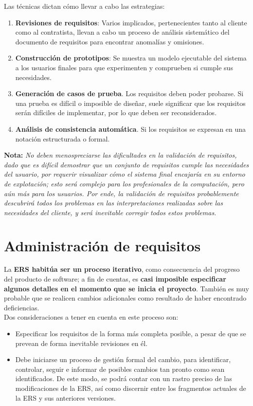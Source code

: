 Las técnicas dictan cómo llevar a cabo las estrategias:

\begin{enumerate}
    \item \textbf{Revisiones de requisitos}: Varios implicados, pertenecientes tanto al cliente como al contratista, llevan a cabo un proceso de análisis sistemático del documento de requisitos para encontrar anomalías y omisiones.
    \item \textbf{Construcción de prototipos}: Se muestra un modelo ejecutable del sistema a los usuarios finales para que experimenten y comprueben si cumple sus necesidades.
    \item \textbf{Generación de casos de prueba}. Los requisitos deben poder probarse. Si una prueba es difícil o imposible de diseñar, suele significar que los requisitos serán difíciles de implementar, por lo que deben ser reconsiderados.
    \item \textbf{Análisis de consistencia automática}. Si los requisitos se expresan en una notación estructurada o formal.
\end{enumerate}

\textbf{Nota:} \textit{No deben menospreciarse las dificultades en la validación de requisitos, dado que es difícil demostrar que un conjunto de requisitos cumple las necesidades del usuario, por requerir visualizar cómo el sistema final encajaría en su entorno de explotación; esto será complejo para los profesionales de la computación, pero aún más para los usuarios. Por ende, la validación de requisitos probablemente descubrirá todos los problemas en las interpretaciones realizadas sobre las necesidades del cliente, y será inevitable corregir todos estos problemas.}


\section{Administración de requisitos}

La \textbf{ERS habitúa ser un proceso iterativo}, como consecuencia del progreso del producto de software; a fin de cuentas, es \textbf{casi imposible especificar algunos detalles en el momento que se inicia el proyecto}. También es muy probable que se realicen cambios adicionales como resultado de haber encontrado deficiencias.\\

Dos consideraciones a tener en cuenta en este proceso son:

\begin{itemize}
    \item Especificar los requisitos de la forma más completa posible, a pesar de que se prevean de forma inevitable revisiones en él.
    \item Debe iniciarse un proceso de gestión formal del cambio, para identificar, controlar, seguir e informar de posibles cambios tan pronto como sean identificados. De este modo, se podrá contar con un rastro preciso de las modificaciones de la ERS, así como discernir entre los fragmentos actuales de la ERS y sus anteriores versiones.
\end{itemize}

